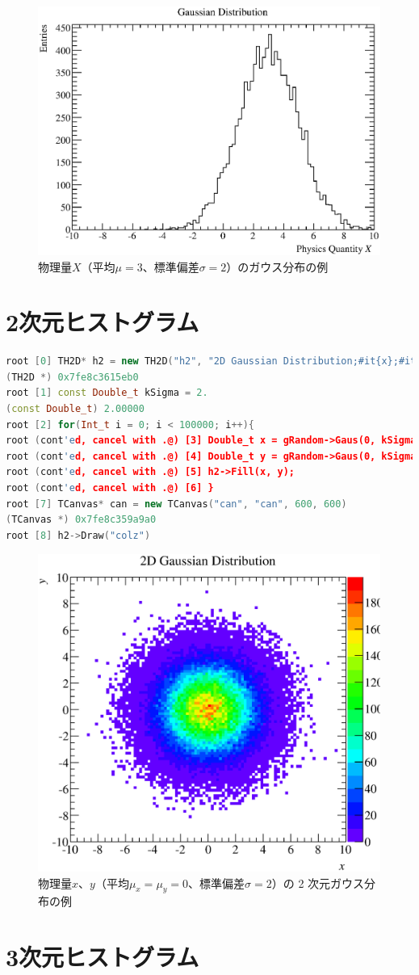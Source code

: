 \begin{figure}
  \centering
  \includegraphics[width=12cm,clip]{fig/TH1D.eps}
  \caption{物理量$X$（平均$\mu = 3$、標準偏差$\sigma = 2$）のガウス分布の例}
  \label{fig_TH1D_eps}
\end{figure}

\section{2次元ヒストグラム}

\begin{lstlisting}[language=c++,breaklines=true]
root [0] TH2D* h2 = new TH2D("h2", "2D Gaussian Distribution;#it{x};#it{y};Entries", 100, -10, 10, 100, -10, 10)
(TH2D *) 0x7fe8c3615eb0
root [1] const Double_t kSigma = 2.
(const Double_t) 2.00000
root [2] for(Int_t i = 0; i < 100000; i++){
root (cont'ed, cancel with .@) [3] Double_t x = gRandom->Gaus(0, kSigma);
root (cont'ed, cancel with .@) [4] Double_t y = gRandom->Gaus(0, kSigma);
root (cont'ed, cancel with .@) [5] h2->Fill(x, y);
root (cont'ed, cancel with .@) [6] }
root [7] TCanvas* can = new TCanvas("can", "can", 600, 600)
(TCanvas *) 0x7fe8c359a9a0
root [8] h2->Draw("colz")
\end{lstlisting}

\begin{figure}
  \centering
  \includegraphics[width=12cm,clip]{fig/TH2D.eps}
  \caption{物理量$x$、$y$（平均$\mu_x = \mu_y = 0$、標準偏差$\sigma = 2$）の 2 次元ガウス分布の例}
  \label{fig_TH2D_eps}
\end{figure}

\section{3次元ヒストグラム}
